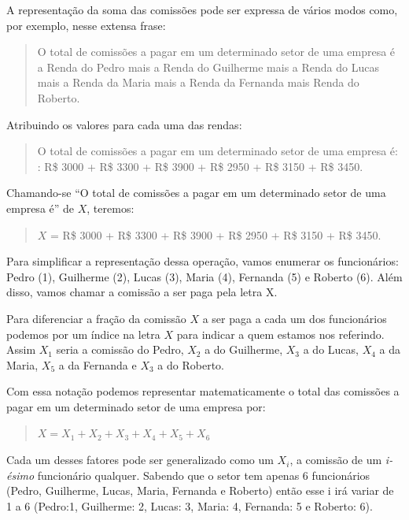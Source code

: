 \documentclass[
]{book}
\begin{document}
A representação da soma das comissões pode ser expressa de vários modos como, por exemplo, nesse extensa frase:

\hfill\break

\begin{quote}
O total de comissões a pagar em um determinado setor de uma empresa é a Renda do Pedro mais a Renda do Guilherme mais a Renda do Lucas mais a Renda da Maria mais a Renda da Fernanda mais Renda do Roberto.
\end{quote}

\hfill\break

Atribuindo os valores para cada uma das rendas:

\hfill\break

\begin{quote}
O total de comissões a pagar em um determinado setor de uma empresa é: : R\$ 3000 + R\$ 3300 + R\$ 3900 + R\$ 2950 + R\$ 3150 + R\$ 3450.
\end{quote}

\hfill\break

Chamando-se ``O total de comissões a pagar em um determinado setor de uma empresa é'' de \(X\), teremos:

\hfill\break

\begin{quote}
\(X\) = R\$ 3000 + R\$ 3300 + R\$ 3900 + R\$ 2950 + R\$ 3150 + R\$ 3450.
\end{quote}

\hfill\break

Para simplificar a representação dessa operação, vamos enumerar os funcionários: Pedro (1), Guilherme (2), Lucas (3), Maria (4), Fernanda (5) e Roberto (6). Além disso, vamos chamar a comissão a ser paga pela letra X.

Para diferenciar a fração da comissão \(X\) a ser paga a cada um dos funcionários podemos por um índice na letra \(X\) para indicar a quem estamos nos referindo. Assim \(X_{1}\) seria a comissão do Pedro, \(X_{2}\) a do Guilherme, \(X_{3}\) a do Lucas, \(X_{4}\) a da Maria, \(X_{5}\) a da Fernanda e \(X_{3}\) a do Roberto.

Com essa notação podemos representar matematicamente o total das comissões a pagar em um determinado setor de uma empresa por:

\begin{quote}
\(X=X_{1}+X_{2}+X_{3}+X_{4}+X_{5}+X_{6}\)
\end{quote}

Cada um desses fatores pode ser generalizado como um \(X_{i}\), a comissão de um \emph{i-ésimo} funcionário qualquer. Sabendo que o setor tem apenas 6 funcionários (Pedro, Guilherme, Lucas, Maria, Fernanda e Roberto) então esse i irá variar de 1 a 6 (Pedro:1, Guilherme: 2, Lucas: 3, Maria: 4, Fernanda: 5 e Roberto: 6).
\end{document}

